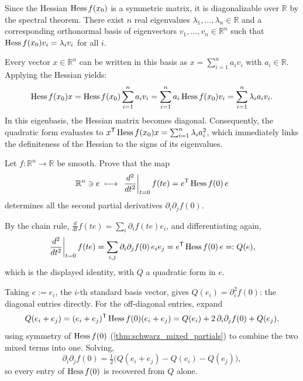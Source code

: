 \begin{remark}
\label{rem:diagonalizing_hessian}
Since the Hessian $\operatorname{Hess} f(x_0)$ is a symmetric matrix, it is diagonalizable over $\mathbb{R}$ by the spectral theorem. There exist $n$ real eigenvalues $\lambda_1, \dots, \lambda_n \in \mathbb{R}$ and a corresponding orthonormal basis of eigenvectors $v_1, \dots, v_n \in \mathbb{R}^n$ such that $\operatorname{Hess} f(x_0) v_i = \lambda_i v_i$ for all $i$.

Every vector $x \in \mathbb{R}^n$ can be written in this basis as $x = \sum_{i=1}^n a_i v_i$ with $a_i \in \mathbb{R}$. Applying the Hessian yields:
\[
  \operatorname{Hess} f(x_0) x = \operatorname{Hess} f(x_0) \sum_{i=1}^n a_i v_i = \sum_{i=1}^n a_i \operatorname{Hess} f(x_0) v_i = \sum_{i=1}^n \lambda_i a_i v_i.
\]
In this eigenbasis, the Hessian matrix becomes diagonal. Consequently, the quadratic form evaluates to $x^{\mathsf{T}} \operatorname{Hess} f(x_0) x = \sum_{i=1}^n \lambda_i a_i^2$, which immediately links the definiteness of the Hessian to the signs of its eigenvalues.
\end{remark}

\begin{exercise}
\label{ex:polarisation_formula}
Let $f : \mathbb{R}^n \to \mathbb{R}$ be smooth. Prove that the map
\[\mathbb{R}^n \ni e \ \longmapsto\ \left.\frac{d^2}{dt^2}\right|_{t=0} f(te) = e^{\mathsf{T}} \operatorname{Hess} f(0)\,e\]
determines all the second partial derivatives $\partial_i\partial_jf(0)$.
\end{exercise}

\begin{exercisesolution}
By the chain rule, $\tfrac{d}{dt}f(te) = \sum_i \partial_if(te)e_i$, and differentiating again,
\[\left.\frac{d^2}{dt^2}\right|_{t=0}f(te) = \sum_{i,j}\partial_i\partial_jf(0)\,e_ie_j
  = e^{\mathsf{T}}\operatorname{Hess} f(0)\,e =: Q(e),\]
which is the displayed identity, with $Q$ a quadratic form in $e$.

Taking $e := e_i$, the $i$-th standard basis vector, gives $Q(e_i) = \partial_i^2f(0)$: the
diagonal entries directly. For the off-diagonal entries, expand
\[Q(e_i+e_j) = (e_i+e_j)^{\mathsf{T}}\operatorname{Hess} f(0)(e_i+e_j)
  = Q(e_i) + 2\,\partial_i\partial_jf(0) + Q(e_j),\]
using symmetry of $\operatorname{Hess} f(0)$ (\cref{thm:schwarz_mixed_partials}) to combine the two mixed
terms into one. Solving,
\[\partial_i\partial_jf(0) = \tfrac12\big(Q(e_i+e_j) - Q(e_i) - Q(e_j)\big),\]
so every entry of $\operatorname{Hess} f(0)$ is recovered from $Q$ alone.
\end{exercisesolution}

